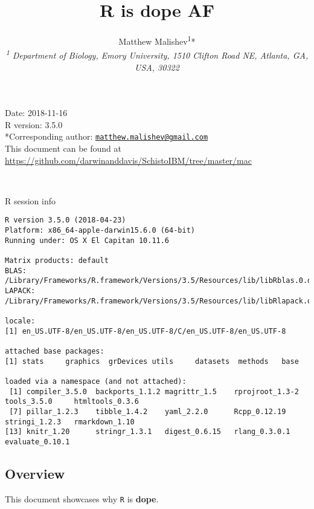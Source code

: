 \documentclass[10,portrait]{article}
\title{R is dope AF}
\author{Matthew
Malishev\textsuperscript{1}*\\[2\baselineskip]\emph{\textsuperscript{1}
Department of Biology, Emory University, 1510 Clifton Road NE, Atlanta,
GA, USA, 30322}}
\date{}
\newenvironment{Shaded}{\begin{snugshade}}{\end{snugshade}}
\newcommand{\OperatorTok}[1]{\textcolor[rgb]{0.81,0.36,0.00}{\textbf{#1}}}
\newcommand{\NormalTok}[1]{#1}
\begin{document}
\maketitle

{
\hypersetup{linkcolor=black}
\setcounter{tocdepth}{4}
\tableofcontents
}
\newpage   

Date: 2018-11-16\\
R version: 3.5.0\\
*Corresponding author:
\href{mailto:matthew.malishev@gmail.com}{\nolinkurl{matthew.malishev@gmail.com}}\\
This document can be found at
\url{https://github.com/darwinanddavis/SchistoIBM/tree/master/mac}

~

R session info

\begin{Shaded}
\end{Shaded}

\begin{verbatim}
R version 3.5.0 (2018-04-23)
Platform: x86_64-apple-darwin15.6.0 (64-bit)
Running under: OS X El Capitan 10.11.6

Matrix products: default
BLAS: /Library/Frameworks/R.framework/Versions/3.5/Resources/lib/libRblas.0.dylib
LAPACK: /Library/Frameworks/R.framework/Versions/3.5/Resources/lib/libRlapack.dylib

locale:
[1] en_US.UTF-8/en_US.UTF-8/en_US.UTF-8/C/en_US.UTF-8/en_US.UTF-8

attached base packages:
[1] stats     graphics  grDevices utils     datasets  methods   base     

loaded via a namespace (and not attached):
 [1] compiler_3.5.0  backports_1.1.2 magrittr_1.5    rprojroot_1.3-2 tools_3.5.0     htmltools_0.3.6
 [7] pillar_1.2.3    tibble_1.4.2    yaml_2.2.0      Rcpp_0.12.19    stringi_1.2.3   rmarkdown_1.10 
[13] knitr_1.20      stringr_1.3.1   digest_0.6.15   rlang_0.3.0.1   evaluate_0.10.1
\end{verbatim}

\newpage  

\subsection{Overview}\label{overview}

This document showcases why \texttt{R} is \textbf{dope}.
\end{document}
